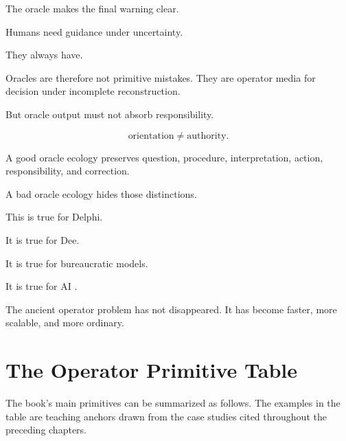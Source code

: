 \documentclass[11pt]{book}
\begin{document}
The oracle makes the final warning clear.

Humans need guidance under uncertainty.

They always have.

Oracles are therefore not primitive mistakes. They are operator media for decision under incomplete reconstruction.

But oracle output must not absorb responsibility.

\[
\text{orientation} \neq \text{authority}.
\]

A good oracle ecology preserves question, procedure, interpretation, action, responsibility, and correction.

A bad oracle ecology hides those distinctions.

This is true for Delphi.

It is true for Dee.

It is true for bureaucratic models.

It is true for AI \cite{Fontenrose1978DelphicOracle,DeeCasaubon1659TrueFaithfulRelation,OConnor2016WeaponsMathDestruction,Cameron2026IPRP}.

The ancient operator problem has not disappeared. It has become faster, more scalable, and more ordinary.

\section{The Operator Primitive Table}

The book’s main primitives can be summarized as follows. The examples in the table are teaching anchors drawn from the case studies cited throughout the preceding chapters.
\end{document}
